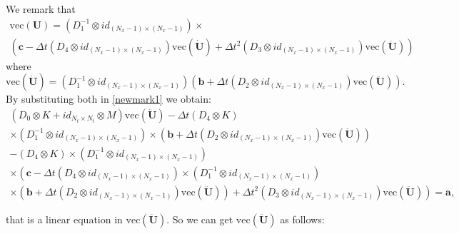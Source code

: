 \documentclass[a4paper, 10pt]{article}
\begin{document}
We remark that
\begin{align*}
\mathrm{vec}(\mathbf{U}) =\left( D_1^{-1} \otimes  id_{(N_x-1)\times(N_x-1)}\right) \times \\
\left( \mathbf{c} - 
\Delta t
\left(D_4 \otimes  id_{(N_x-1)\times(N_x-1)} \right)\mathrm{vec}(\dot{\mathbf{U}}) + \Delta t^2 \left( D_3 \otimes  id_{(N_x-1)\times(N_x-1)} \right) \mathrm{vec}(\ddot{\mathbf{U}})
\right) 
\end{align*}
where
$$
\mathrm{vec}(\dot{\mathbf{U}}) = \left( D_1^{-1} \otimes  id_{(N_x-1)\times(N_x-1)}\right)\left( \mathbf{b} +  \Delta t \left( D_2 \otimes  id_{(N_x-1)\times(N_x-1)}\right) \mathrm{vec}(\ddot{\mathbf{U}})\right).
$$
By substituting both in \eqref{newmark1} we obtain:
$$
\begin{array}{c}
\left(D_0 \otimes K + id_{N_t \times N_t} \otimes  M  \right) \mathrm{vec}(\ddot{\mathbf{U}}) - \Delta t \left(D_4 \otimes  K \right) \\
\times \left( D_1^{-1} \otimes  id_{(N_x-1)\times(N_x-1)}\right) \times \left( \mathbf{b} +  \Delta t \left( D_2 \otimes  id_{(N_x-1)\times(N_x-1)}\right) \mathrm{vec}(\ddot{\mathbf{U}})\right) \\ 
 -  \left( D_4 \otimes   K\right) \times \left( D_1^{-1} \otimes  id_{(N_x-1)\times(N_x-1)}\right) \\ 
\times \left( \mathbf{c} - \Delta t \left(D_4 \otimes  id_{(N_x-1)\times(N_x-1)} \right) \times \left( D_1^{-1} \otimes  id_{(N_x-1)\times(N_x-1)}\right) \right. \\
\left. \times \left( \mathbf{b} +  \Delta t \left( D_2 \otimes  id_{(N_x-1)\times(N_x-1)}\right) \mathrm{vec}(\ddot{\mathbf{U}})\right) + \Delta t^2 \left( D_3 \otimes  id_{(N_x-1)\times(N_x-1)} \right) \mathrm{vec}(\ddot{\mathbf{U}}) \right)   =
\mathbf{a},
\end{array}
$$

that is a linear equation in $\mathrm{vec}(\ddot{\mathbf{U}}).$ So we can get $\mathrm{vec}(\ddot{\mathbf{U}})$ as follows:
\end{document}
